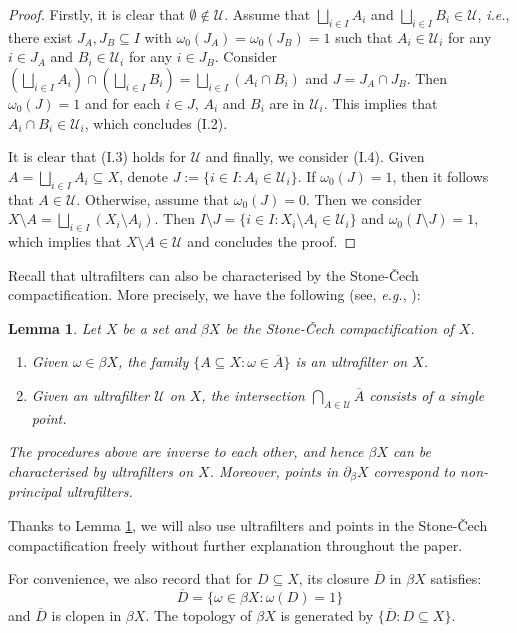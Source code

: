 \documentclass[12pt, a4paper]{amsart}
\numberwithin{equation}{section}
\newtheorem{lem}[thm]{Lemma}
\theoremstyle{definition}
\theoremstyle{remark}
\def\U{\mathcal{U}}
\begin{document}
\begin{proof}
Firstly, it is clear that $\emptyset \notin \U$. Assume that $\bigsqcup_{i\in I} A_i$ and $\bigsqcup_{i\in I} B_i \in \U$, \emph{i.e.}, there exist $J_A, J_B \subseteq I$ with $\omega_0(J_A) = \omega_0(J_B)=1$ such that $A_i \in \U_i$ for any $i \in J_A$ and $B_i \in \U_i$ for any $i\in J_B$. Consider $(\bigsqcup_{i\in I} A_i) \cap (\bigsqcup_{i\in I} B_i) = \bigsqcup_{i\in I} (A_i \cap B_i)$ and $J=J_A \cap J_B$. Then $\omega_0(J) = 1$ and for each $i\in J$, $A_i$ and $B_i$ are in $\U_i$. This implies that $A_i \cap B_i \in \U_i$, which concludes (I.2).

It is clear that (I.3) holds for $\U$ and finally, we consider (I.4). Given $A=\bigsqcup_{i\in I} A_i \subseteq X$, denote $J:=\{i \in I: A_i \in \U_i\}$. If $\omega_0(J)=1$, then it follows that $A \in \U$. Otherwise, assume that $\omega_0(J)=0$. Then we consider $X \setminus A = \bigsqcup_{i\in I} (X_i \setminus A_i)$. Then $I \setminus J = \{i\in I: X_i \setminus A_i \in \U_i\}$ and $\omega_0(I \setminus J) =1$, which implies that $X \setminus A \in \U$ and concludes the proof. 
\end{proof}


Recall that ultrafilters can also be characterised by the Stone-\v{C}ech compactification. More precisely, we have the following (see, \emph{e.g.}, \cite[Chapter 7.4]{Roe03}):

\begin{lem}\label{lem:ultrafilter to SC comp.}
Let $X$ be a set and $\beta X$ be the Stone-\v{C}ech compactification of $X$. 
\begin{enumerate}
 \item Given $\omega \in \beta X$, the family $\{A \subseteq X: \omega \in \overline{A}\}$ is an ultrafilter on $X$.
 \item Given an ultrafilter $\U$ on $X$, the intersection $\bigcap_{A \in \U} \overline{A}$ consists of a single point.
\end{enumerate}
The procedures above are inverse to each other, and hence $\beta X$ can be characterised by ultrafilters on $X$. Moreover, points in $\partial_\beta X$ correspond to non-principal ultrafilters.
\end{lem}

Thanks to Lemma \ref{lem:ultrafilter to SC comp.}, we will also use ultrafilters and points in the Stone-\v{C}ech compactification freely without further explanation throughout the paper. 

For convenience, we also record that for $D \subseteq X$, its closure $\overline{D}$ in $\beta X$ satisfies:
\[
\overline{D} = \{\omega \in \beta X: \omega(D)=1 \}
\]
and $\overline{D}$ is clopen in $\beta X$. The topology of $\beta X$ is generated by $\{\overline{D}: D \subseteq X\}$.
\end{document}
